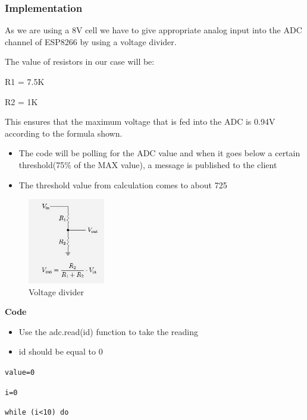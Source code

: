 \documentclass[16pt]{article}
\begin{document}
\subsubsection{Implementation}


  As we are using a 8V cell we have to give appropriate analog input
  into the ADC channel of ESP8266 by using a voltage divider.




The value of resistors in our case will be:

R1 = 7.5K

R2 = 1K

This ensures that the maximum voltage that is fed into the ADC is 0.94V
according to the formula shown.



\begin{itemize}

\item
  The code will be polling for the ADC value and when it goes below a
  certain threshold(75\% of the MAX value), a message is published to
  the client
\item
  The threshold value from calculation comes to about 725
\end{itemize}


\begin{figure}
\hspace{3.5cm}
\includegraphics[width=0.3\textwidth]{images/divider.jpeg}
\caption{Voltage divider}
\end{figure}


\textbf{Code}

\begin{itemize}

\item
  Use the adc.read(id) function to take the reading
\item
  id should be equal to 0
\end{itemize}

\texttt{value=0}

\texttt{i=0}

\texttt{while (i\textless{}10) do}
\end{document}
